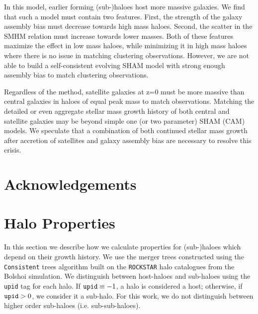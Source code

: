 \documentclass[a4paper,fleqn,usenatbib]{mnras}
\begin{document}
    In this model, earlier forming (sub-)haloes host more massive galaxies.  We find that such a model must contain two features.  First, the strength of the galaxy assembly bias must decrease towards high mass haloes.  Second, the scatter in the SMHM relation must increase towards lower masses.  Both of these features maximize the effect in low mass haloes, while minimizing it in high mass haloes where there is no issue in matching clustering observations.  However, we are not able to build a self-consistent evolving SHAM model with strong enough assembly bias to match clustering observations.

Regardless of the method, satellite galaxies at z=0 must be more massive than central galaxies in haloes of equal peak mass to match observations.  Matching the detailed or even aggregate stellar mass growth history of both central and satellite galaxies may be beyond simple one (or two parameter) SHAM (CAM) models.  We speculate that a combination of both continued stellar mass growth after accretion of satellites and galaxy assembly bias are necessary to resolve this crisis.


\section*{Acknowledgements}

%

 

\appendix

\section{Halo Properties}
\label{sec:halo_properties}

In this section we describe how we calculate properties for (sub-)haloes which depend on their growth history.  We use the merger trees constructed using the {\tt Consistent} trees algorithm \citep{Behroozi:2013dz} built on the {\tt ROCKSTAR} halo catalogues from the Bolshoi simulation.  We distinguish between host-haloes and sub-haloes using the {\tt upid} tag for each halo.  If $ {\tt upid} \equiv -1$, a halo is considered a host; otherwise, if ${\tt upid} > 0$, we consider it a sub-halo.  For this work, we do not distinguish between higher order sub-haloes (i.e. sub-sub-haloes).
\end{document}
